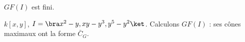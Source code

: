             \begin{coro}
                $GF(I)$ est fini.
            \end{coro}
            \begin{expl}
                $k[x,y]$, $I = \bra x^2 - y, xy - y^3, y^5 - y^2 \ket$. Calculons $GF(I)$ : ses cônes maximaux ont la forme $\bar C_G$.
            \end{expl}